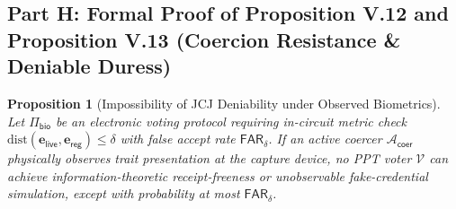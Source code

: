 \documentclass[10pt,letterpaper,journal]{IEEEtran}
\newtheorem{proposition}[theorem]{Proposition}
\begin{document}
\subsection{Part H: Formal Proof of Proposition V.12 and Proposition V.13 (Coercion Resistance \& Deniable Duress)}
\label{sec:supp-proof-coercion}

\begin{proposition}[Impossibility of JCJ Deniability under Observed Biometrics]
\label{prop:supp-coercion}
Let $\Pi_{\mathsf{bio}}$ be an electronic voting protocol requiring in-circuit metric check $\mathrm{dist}(\mathbf{e}_{\mathsf{live}}, \mathbf{e}_{\mathsf{reg}}) \leq \delta$ with false accept rate $\mathsf{FAR}_\delta$. If an active coercer $\mathcal{A}_{\mathsf{coer}}$ physically observes trait presentation at the capture device, no PPT voter $\mathcal{V}$ can achieve information-theoretic receipt-freeness or unobservable fake-credential simulation, except with probability at most $\mathsf{FAR}_\delta$.
\end{proposition}
\end{document}
